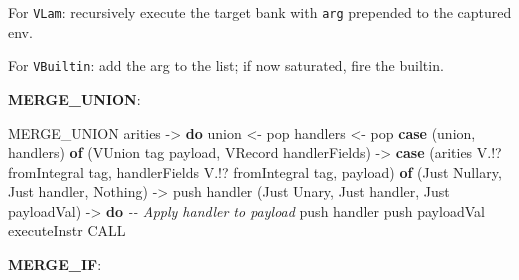\documentclass[]{article}
\newenvironment{Shaded}{}{}
\newcommand{\CommentTok}[1]{\textcolor[rgb]{0.38,0.63,0.69}{\textit{#1}}}
\newcommand{\DataTypeTok}[1]{\textcolor[rgb]{0.56,0.13,0.00}{#1}}
\newcommand{\FunctionTok}[1]{\textcolor[rgb]{0.02,0.16,0.49}{#1}}
\newcommand{\KeywordTok}[1]{\textcolor[rgb]{0.00,0.44,0.13}{\textbf{#1}}}
\newcommand{\NormalTok}[1]{#1}
\newcommand{\OperatorTok}[1]{\textcolor[rgb]{0.40,0.40,0.40}{#1}}
\newcommand{\OtherTok}[1]{\textcolor[rgb]{0.00,0.44,0.13}{#1}}
\begin{document}
For \texttt{VLam}: recursively execute the target bank with \texttt{arg}
prepended to the captured env.

For \texttt{VBuiltin}: add the arg to the list; if now saturated, fire the
builtin.

\textbf{MERGE\_UNION}:

\begin{Shaded}
\begin{Highlighting}[]
\DataTypeTok{MERGE\_UNION}\NormalTok{ arities }\OtherTok{{-}\textgreater{}} \KeywordTok{do}
\NormalTok{    union }\OtherTok{\textless{}{-}}\NormalTok{ pop}
\NormalTok{    handlers }\OtherTok{\textless{}{-}}\NormalTok{ pop}
    \KeywordTok{case}\NormalTok{ (union, handlers) }\KeywordTok{of}
\NormalTok{        (}\DataTypeTok{VUnion}\NormalTok{ tag payload, }\DataTypeTok{VRecord}\NormalTok{ handlerFields) }\OtherTok{{-}\textgreater{}}
            \KeywordTok{case}\NormalTok{ (arities }\OperatorTok{V.!?} \FunctionTok{fromIntegral}\NormalTok{ tag, handlerFields }\OperatorTok{V.!?} \FunctionTok{fromIntegral}\NormalTok{ tag, payload) }\KeywordTok{of}
\NormalTok{                (}\DataTypeTok{Just} \DataTypeTok{Nullary}\NormalTok{, }\DataTypeTok{Just}\NormalTok{ handler, }\DataTypeTok{Nothing}\NormalTok{) }\OtherTok{{-}\textgreater{}}\NormalTok{ push handler}
\NormalTok{                (}\DataTypeTok{Just} \DataTypeTok{Unary}\NormalTok{, }\DataTypeTok{Just}\NormalTok{ handler, }\DataTypeTok{Just}\NormalTok{ payloadVal) }\OtherTok{{-}\textgreater{}} \KeywordTok{do}
                    \CommentTok{{-}{-} Apply handler to payload}
\NormalTok{                    push handler}
\NormalTok{                    push payloadVal}
\NormalTok{                    executeInstr }\DataTypeTok{CALL}
\end{Highlighting}
\end{Shaded}

\textbf{MERGE\_IF}:

\begin{Shaded}
\end{Shaded}
\end{document}
